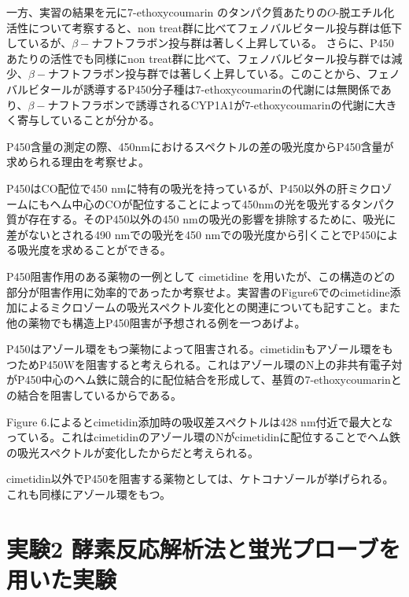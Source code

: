 \documentclass[a4paper,papersize,dvipdfmx]{jsarticle}
\begin{document}
一方、実習の結果を元に7-ethoxycoumarin のタンパク質あたりの$O$-脱エチル化活性について考察すると、non treat群に比べてフェノバルビタール投与群は低下しているが、$\beta -$ナフトフラボン投与群は著しく上昇している。
さらに、P450あたりの活性でも同様にnon treat群に比べて、フェノバルビタール投与群では減少、$\beta -$ナフトフラボン投与群では著しく上昇している。このことから、フェノバルビタールが誘導するP450分子種は7-ethoxycoumarinの代謝には無関係であり、$\beta -$ナフトフラボンで誘導されるCYP1A1が7-ethoxycoumarinの代謝に大きく寄与していることが分かる。

\begin{tcolorbox}[colback=white,colbacktitle=black,coltitle=white,title={(2)}]
P450含量の測定の際、450nmにおけるスペクトルの差の吸光度からP450含量が求められる理由を考察せよ。
\end{tcolorbox}

P450はCO配位で450 nmに特有の吸光を持っているが、P450以外の肝ミクロゾームにもヘム中心のCOが配位することによって450nmの光を吸光するタンパク質が存在する。そのP450以外の450 nmの吸光の影響を排除するために、吸光に差がないとされる490 nmでの吸光を450 nmでの吸光度から引くことでP450による吸光度を求めることができる。

\begin{tcolorbox}[colback=white,colbacktitle=black,coltitle=white,title={(3)}]
P450阻害作用のある薬物の一例として cimetidine を用いたが、この構造のどの部分が阻害作用に効率的であったか考察せよ。実習書のFigure6でのcimetidine添加によるミクロゾームの吸光スペクトル変化との関連についても記すこと。また他の薬物でも構造上P450阻害が予想される例を一つあげよ。
\end{tcolorbox}

P450はアゾール環をもつ薬物によって阻害される。cimetidinもアゾール環をもつためP450Wを阻害すると考えられる。これはアゾール環のN上の非共有電子対がP450中心のヘム鉄に競合的に配位結合を形成して、基質の7-ethoxycoumarinとの結合を阻害しているからである。

Figure 6.によるとcimetidin添加時の吸収差スペクトルは428 nm付近で最大となっている。これはcimetidinのアゾール環のNがcimetidinに配位することでヘム鉄の吸光スペクトルが変化したからだと考えられる。

cimetidin以外でP450を阻害する薬物としては、ケトコナゾールが挙げられる。これも同様にアゾール環をもつ。

\part*{実験2 酵素反応解析法と蛍光プローブを用いた実験}
\end{document}
